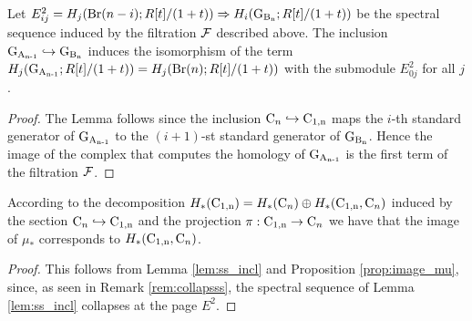 \begin{lem}\label{lem:ss_incl}
Let $E^2_{ij} =  H_j(\operatorname{Br}(n-i);R[t]/(1+t)) \Rightarrow H_i(\operatorname{G_{B_{n}}}; R[t]/(1+t))$ be the spectral sequence induced by the
filtration $\mathcal{F}$ described above. The inclusion $\operatorname{G_{A_{n-1}}} \hookrightarrow \operatorname{G_{B_{n}}}$ induces the isomorphism of the term $H_j(\operatorname{G_{A_{n-1}}}; R[t]/(1+t)) = H_j(\operatorname{Br}(n);R[t]/(1+t)) $ with the submodule $E^2_{0j}$ for all $j$.
\end{lem}
\begin{proof}
The Lemma follows since the inclusion $\operatorname{C}_n \hookrightarrow \operatorname{C_{1,n}}$ maps the $i$-th standard generator of $\operatorname{G_{A_{n-1}}}$ to the $(i+1)$-st standard generator of $\operatorname{G_{B_{n}}}$. Hence the image of the complex that computes the homology of $\operatorname{G_{A_{n-1}}}$ is the first term of the filtration $\mathcal{F}$.
\end{proof}
\begin{cor}\label{cor:image_mu}
According to the decomposition $H_*(\operatorname{C_{1,n}})= H_*(\operatorname{C}_n) \oplus H_*(\operatorname{C_{1,n}}, \operatorname{C}_n)$ induced by the section $\operatorname{C}_n \hookrightarrow \operatorname{C_{1,n}}$  and the projection $\pi: \operatorname{C_{1,n}} \to \operatorname{C}_n$ we have that the image of $\mu_*$ corresponds to $H_*(\operatorname{C_{1,n}}, \operatorname{C}_n)$.
\end{cor}
\begin{proof}
This follows from Lemma \ref{lem:ss_incl} and Proposition \ref{prop:image_mu}, since, as seen in Remark \ref{rem:collapsss}, the spectral sequence of Lemma \ref{lem:ss_incl} collapses at the page $E^2$.
\end{proof}

